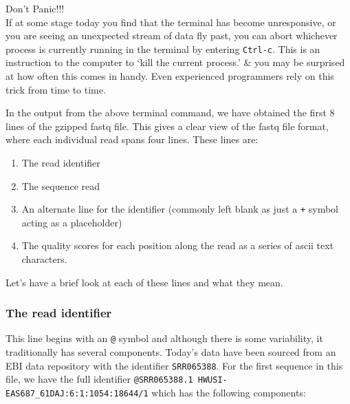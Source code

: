 \begin{warning}
\large{Don't Panic!!!} \\
\normalsize
If at some stage today you find that the terminal has become unresponsive, or you are seeing an unexpected stream of data fly past, you can abort whichever process is currently running in the terminal by entering \texttt{Ctrl-c}.
This is an instruction to the computer to `kill the current process.' \& you may be surprised at how often this comes in handy.
Even experienced programmers rely on this trick from time to time.
\end{warning}

\begin{note}
In the output from the above terminal command, we have obtained the first 8 lines of the gzipped fastq file.
This gives a clear view of the fastq file format, where each individual read spans four lines.
These lines are:
\begin{enumerate}
\item The read identifier
\item The sequence read
\item An alternate line for the identifier (commonly left blank as just a \texttt{+} symbol acting as a placeholder)
\item The quality scores for each position along the read as a series of ascii text characters.
\end{enumerate}
\end{note}

Let's have a brief look at each of these lines and what they mean.\\

\subsubsection*{The read identifier}
This line begins with an \texttt{@} symbol and although there is some variability, it traditionally has several components.
Today's data have been sourced from an EBI data repository with the identifier \texttt{SRR065388}.
For the first sequence in this file, we have the full identifier \texttt{@SRR065388.1 HWUSI-EAS687\_61DAJ:6:1:1054:18644/1} which has the following components: \\


